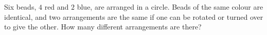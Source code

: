 Six beads, $4$ red and $2$ blue, are arranged in a circle. Beads of the same colour are identical, and two arrangements are the same if one can be rotated or turned over to give the other. How many different arrangements are there?
